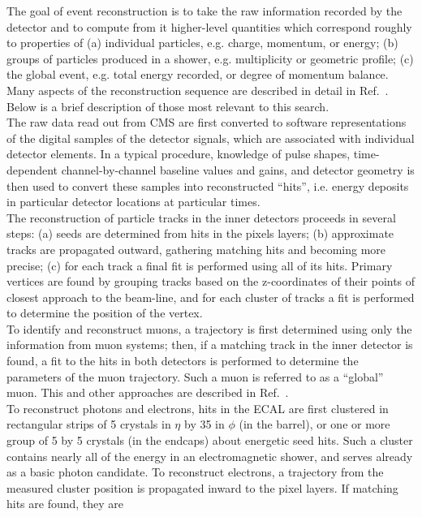 The goal of event reconstruction is to take the raw information recorded by the
detector and to compute from it higher-level quantities which correspond roughly to
properties of (a) individual particles, e.g. charge, momentum, or energy; (b) groups
of particles produced in a shower, e.g. multiplicity or geometric proﬁle; (c) the global
event, e.g. total energy recorded, or degree of momentum balance. Many aspects of
the reconstruction sequence are described in detail in Ref.~\cite{Bayatian:922757,Bayatian:942733}. 
Below is a brief description of those most relevant to this search.\\
\indent The raw data read out from CMS are first converted to software representations
of the digital samples of the detector signals, which are associated with individual
detector elements. In a typical procedure, knowledge of pulse shapes, time-dependent
channel-by-channel baseline values and gains, and detector geometry is then used to
convert these samples into reconstructed ``hits'', i.e. energy deposits in particular
detector locations at particular times.\\
\indent The reconstruction of particle tracks in the inner detectors proceeds in several
steps: (a) seeds are determined from hits in the pixels layers; (b) approximate tracks
are propagated outward, gathering matching hits and becoming more precise; (c) for
each track a final fit is performed using all of its hits. Primary vertices are found by
grouping tracks based on the z-coordinates of their points of closest approach to the
beam-line, and for each cluster of tracks a fit is performed to determine the position
of the vertex. \\ 
\indent To identify and reconstruct muons, a trajectory is first determined using only the
information from muon systems; then, if a matching track in the inner detector is
found, a fit to the hits in both detectors is performed to determine the parameters of
the muon trajectory. Such a muon is referred to as a “global” muon. This and other
approaches are described in Ref.~\cite{PAS-MUO-10-002}. \\
\indent To reconstruct photons and electrons, hits in the ECAL are ﬁrst clustered in
rectangular strips of 5 crystals in $\eta$ by 35 in $\phi$ (in the barrel), or one or more group
of 5 by 5 crystals (in the endcaps) about energetic seed hits. Such a cluster contains
nearly all of the energy in an electromagnetic shower, and serves already as a basic
photon candidate. To reconstruct electrons, a trajectory from the measured cluster
position is propagated inward to the pixel layers. If matching hits are found, they are
